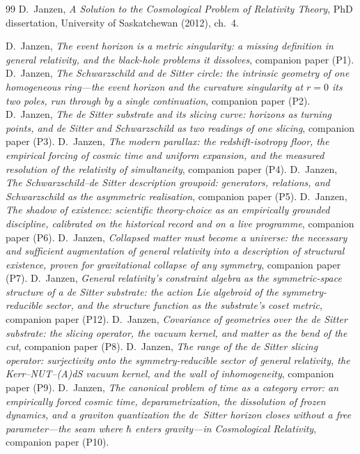 \documentclass[11pt,a4paper]{article}
\theoremstyle{plain}
\theoremstyle{definition}
\theoremstyle{remark}
\begin{document}
\begin{thebibliography}{99}
 D.~Janzen, \emph{A Solution to the Cosmological Problem of Relativity Theory}, PhD dissertation, University of Saskatchewan (2012), ch.~4.

 D.~Janzen, \emph{The event horizon is a metric singularity: a missing definition in general relativity, and the black-hole problems it dissolves}, companion paper (P1).
 D.~Janzen, \emph{The Schwarzschild and de Sitter circle: the intrinsic geometry of one homogeneous ring---the event horizon and the curvature singularity at $r=0$ its two poles, run through by a single continuation}, companion paper (P2).
 D.~Janzen, \emph{The de Sitter substrate and its slicing curve: horizons as turning points, and de Sitter and Schwarzschild as two readings of one slicing}, companion paper (P3).
 D.~Janzen, \emph{The modern parallax: the redshift-isotropy floor, the empirical forcing of cosmic time and uniform expansion, and the measured resolution of the relativity of simultaneity}, companion paper (P4).
 D.~Janzen, \emph{The Schwarzschild--de Sitter description groupoid: generators, relations, and Schwarzschild as the asymmetric realisation}, companion paper (P5).
 D.~Janzen, \emph{The shadow of existence: scientific theory-choice as an empirically grounded discipline, calibrated on the historical record and on a live programme}, companion paper (P6).
 D.~Janzen, \emph{Collapsed matter must become a universe: the necessary and sufficient augmentation of general relativity into a description of structural existence, proven for gravitational collapse of any symmetry}, companion paper (P7).
 D.~Janzen, \emph{General relativity's constraint algebra as the symmetric-space structure of a de Sitter substrate: the action Lie algebroid of the symmetry-reducible sector, and the structure function as the substrate's coset metric}, companion paper (P12).
 D.~Janzen, \emph{Covariance of geometries over the de Sitter substrate: the slicing operator, the vacuum kernel, and matter as the bend of the cut}, companion paper (P8).
 D.~Janzen, \emph{The range of the de Sitter slicing operator: surjectivity onto the symmetry-reducible sector of general relativity, the Kerr--NUT--(A)dS vacuum kernel, and the wall of inhomogeneity}, companion paper (P9).
 D.~Janzen, \emph{The canonical problem of time as a category error: an empirically forced cosmic time, deparametrization, the dissolution of frozen dynamics, and a graviton quantization the de~Sitter horizon closes without a free parameter---the seam where $\hbar$ enters gravity---in Cosmological Relativity}, companion paper (P10).

\end{thebibliography}
\end{document}
